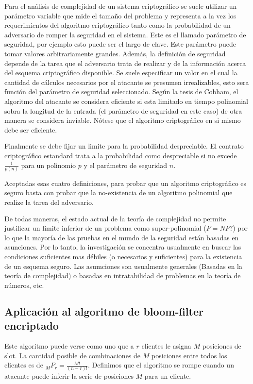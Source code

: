 Para el análisis de complejidad de un sistema criptográfico se suele utilizar un parámetro variable que mide el tamaño del problema y representa a la vez los requerimientos del algoritmo criptográfico tanto como la probabilidad de un adversario de romper la seguridad en el sistema. Este es el llamado parámetro de seguridad, por ejemplo esto puede ser el largo de clave.
Este parámetro puede tomar valores arbitrariamente grandes.
Además, la definición de seguridad depende de la tarea que el adversario trata de realizar y de la información acerca del esquema criptográfico disponible.
Se suele especificar un valor en el cual la cantidad de cálculos necesarios por el atacante se presumen irrealizables, esto sera función del parámetro de seguridad seleccionado.
Según la tesis de Cobham\cite{citeulike:6647003}, el algoritmo del atacante se considera eficiente si esta limitado en tiempo polinomial sobra la longitud de la entrada (el parámetro de seguridad en este caso) de otra manera se considera inviable. Nótese que el algoritmo criptográfico en si mismo debe ser eficiente.

Finalmente se debe fijar un limite para la probabilidad despreciable. El contrato criptográfico estandard trata a la probabilidad como despreciable si no excede $\frac{1}{p(n)}$  para un polinomio $p$ y el parámetro de seguridad $n$.

Aceptadas esas cuatro definiciones, para probar que un algoritmo criptográfico es seguro basta con probar que la no-existencia de un algoritmo polinomial que realize la tarea del adversario.

De todas maneras, el estado actual de la teoría de complejidad no permite justificar un limite inferior de un problema como super-polinomial ($P=NP?$) por lo que la mayoría de las pruebas en el mundo de la seguridad están basadas en asunciones.
Por lo tanto, la investigación se concentra usualmente en buscar las condiciones suficientes mas débiles (o necesarios y suficientes) para la existencia de un esquema seguro.
Las asumciones son usualmente generales (Basadas en la teoría de complejidad) o basadas en intratabilidad de problemas en la teoría de números, etc.

\subsection{Aplicación al algoritmo de bloom-filter encriptado}

Este algoritmo puede verse como uno que a $r$ clientes le asigna $M$ posiciones de slot.
La cantidad posible de combinaciones de $M$ posiciones entre todos los clientes es de $ _{M}P_{r} = \frac{M!}{(n-r)!} $.
Definimos que el algoritmo se rompe cuando un atacante puede inferir la serie de posiciones $M$ para un cliente.

